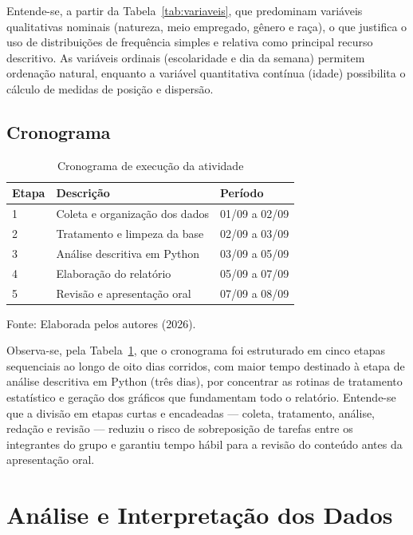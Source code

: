 \documentclass[12pt,a4paper]{article}
\newcommand{\fonte}[1]{  \vspace{-2mm}
  \begin{center}\footnotesize Fonte: #1\end{center}
}
\begin{document}
Entende-se, a partir da Tabela~\ref{tab:variaveis}, que predominam variáveis qualitativas nominais (natureza, meio empregado, gênero e raça), o que justifica o uso de distribuições de frequência simples e relativa como principal recurso descritivo. As variáveis ordinais (escolaridade e dia da semana) permitem ordenação natural, enquanto a variável quantitativa contínua (idade) possibilita o cálculo de medidas de posição e dispersão.

\subsection{Cronograma}

\begin{table}[H]
\centering
\caption{Cronograma de execução da atividade}
\label{tab:cronograma}
\begin{tabular}{lll}
\toprule
\textbf{Etapa} & \textbf{Descrição} & \textbf{Período} \\
\midrule
1 & Coleta e organização dos dados & 01/09 a 02/09 \\
2 & Tratamento e limpeza da base   & 02/09 a 03/09 \\
3 & Análise descritiva em Python   & 03/09 a 05/09 \\
4 & Elaboração do relatório        & 05/09 a 07/09 \\
5 & Revisão e apresentação oral    & 07/09 a 08/09 \\
\bottomrule
\end{tabular}
\end{table}
\fonte{Elaborada pelos autores (2026).}

Observa-se, pela Tabela~\ref{tab:cronograma}, que o cronograma foi estruturado em cinco etapas sequenciais ao longo de oito dias corridos, com maior tempo destinado à etapa de análise descritiva em Python (três dias), por concentrar as rotinas de tratamento estatístico e geração dos gráficos que fundamentam todo o relatório. Entende-se que a divisão em etapas curtas e encadeadas --- coleta, tratamento, análise, redação e revisão --- reduziu o risco de sobreposição de tarefas entre os integrantes do grupo e garantiu tempo hábil para a revisão do conteúdo antes da apresentação oral.

\newpage

\section{Análise e Interpretação dos Dados}
\end{document}
